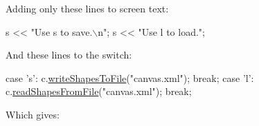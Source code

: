 Adding only these lines to screen text\+:


\begin{DoxyCode}
s <<  \textcolor{stringliteral}{"Use s to save.\(\backslash\)n"};
s <<  \textcolor{stringliteral}{"Use l to load."};
\end{DoxyCode}


And these lines to the switch\+:


\begin{DoxyCode}
\textcolor{keywordflow}{case} \textcolor{charliteral}{'s'}:
    c.\hyperlink{classcanvascv_1_1Canvas_a494bb06b1a29232f05807f4a0e480ebb}{writeShapesToFile}(\textcolor{stringliteral}{"canvas.xml"});
    \textcolor{keywordflow}{break};
\textcolor{keywordflow}{case} \textcolor{charliteral}{'l'}:
    c.\hyperlink{classcanvascv_1_1Canvas_ab68000bb631c2fa7bb8863e746a8cff3}{readShapesFromFile}(\textcolor{stringliteral}{"canvas.xml"});
    \textcolor{keywordflow}{break};
\end{DoxyCode}


Which gives\+:



